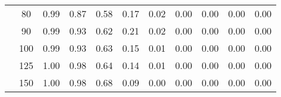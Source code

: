 \begin{table}[t]
\begin{center}
\begin{subtable}[c]{\textwidth}
\begin{center}
\begin{tabular}{rcccccccccc}
                                        & \multicolumn{1}{c|}{80}  & \num{0.99}  & \num{0.87}  & \num{0.58}  & \num{0.17}  & \num{0.02}  & \num{0.00}  & \num{0.00}  & \num{0.00}  & \num{0.00}  \\
                                        & \multicolumn{1}{c|}{90}  & \num{0.99}  & \num{0.93}  & \num{0.62}  & \num{0.21}  & \num{0.02}  & \num{0.00}  & \num{0.00}  & \num{0.00}  & \num{0.00}  \\
                                        & \multicolumn{1}{c|}{100}  & \num{0.99}  & \num{0.93}  & \num{0.63}  & \num{0.15}  & \num{0.01}  & \num{0.00}  & \num{0.00}  & \num{0.00}  & \num{0.00}  \\
                                        & \multicolumn{1}{c|}{125}  & \num{1.00}  & \num{0.98}  & \num{0.64}  & \num{0.14}  & \num{0.01}  & \num{0.00}  & \num{0.00}  & \num{0.00}  & \num{0.00}  \\
                                        & \multicolumn{1}{c|}{150}  & \num{1.00}  & \num{0.98}  & \num{0.68}  & \num{0.09}  & \num{0.00}  & \num{0.00}  & \num{0.00}  & \num{0.00}  & \num{0.00}  \\
                                    \end{tabular}
            \end{center}
        \end{subtable}

        \vspace{5mm}


\end{center}
\end{table}
